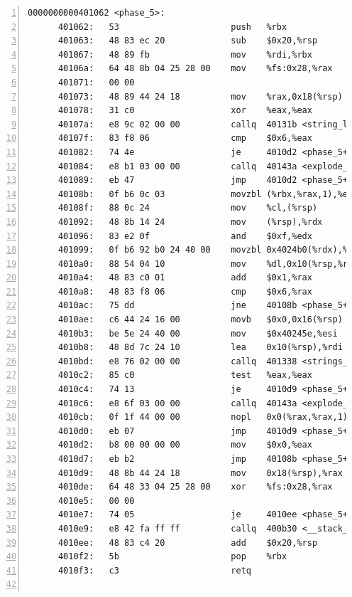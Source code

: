 \documentclass{article}
\begin{document}
\begin{lstlisting}[title = bomb的反汇编代码及部分注释, xleftmargin = 2em,xrightmargin = 2em, aboveskip = 1em, numbers = left, basicstyle=\scriptsize\ttfamily, numberstyle=\scriptsize]
    0000000000401062 <phase_5>:
      401062:	53                   	push   %rbx							
      401063:	48 83 ec 20          	sub    $0x20,%rsp					; %rsp -= 0x20;
      401067:	48 89 fb             	mov    %rdi,%rbx					; %rbx = %rdi;
      40106a:	64 48 8b 04 25 28 00 	mov    %fs:0x28,%rax				; %rax = 0x28;
      401071:	00 00 
      401073:	48 89 44 24 18       	mov    %rax,0x18(%rsp)				; M[%rsp + 0x18] = %rax;
      401078:	31 c0                	xor    %eax,%eax					; %eax ^= %eax;
      40107a:	e8 9c 02 00 00       	callq  40131b <string_length>		; string_length(%rdi);
      40107f:	83 f8 06             	cmp    $0x6,%eax					; if (%eax == 6)
      401082:	74 4e                	je     4010d2 <phase_5+0x70>		;	  goto #500;
      401084:	e8 b1 03 00 00       	callq  40143a <explode_bomb>		; explode_bomb(...);
      401089:	eb 47                	jmp    4010d2 <phase_5+0x70>		; goto #500;
      40108b:	0f b6 0c 03          	movzbl (%rbx,%rax,1),%ecx			; %ecx = %rbx + %rax;
      40108f:	88 0c 24             	mov    %cl,(%rsp)					; M[%rsp] = %cl;
      401092:	48 8b 14 24          	mov    (%rsp),%rdx					; %rdx = M[%rsp];
      401096:	83 e2 0f             	and    $0xf,%edx					; %edx &= 0xf;
      401099:	0f b6 92 b0 24 40 00 	movzbl 0x4024b0(%rdx),%edx			; %edx = M[%rdx + 0x4024b0];
      4010a0:	88 54 04 10          	mov    %dl,0x10(%rsp,%rax,1)		; M[%rsp + %rax + 0x10] = %dl; 
      4010a4:	48 83 c0 01          	add    $0x1,%rax					; %rax++;
      4010a8:	48 83 f8 06          	cmp    $0x6,%rax					; if (%rax != 0x6)
      4010ac:	75 dd                	jne    40108b <phase_5+0x29>		;	  goto #482;
      4010ae:	c6 44 24 16 00       	movb   $0x0,0x16(%rsp)				; M[%rsp + 0x16] = 0;
      4010b3:	be 5e 24 40 00       	mov    $0x40245e,%esi				; %esi = 0x40245e;
      4010b8:	48 8d 7c 24 10       	lea    0x10(%rsp),%rdi				; %rdi = %rsp + 0x10;
      4010bd:	e8 76 02 00 00       	callq  401338 <strings_not_equal>	; strings_not_equal(%rdi, %rsi);
      4010c2:	85 c0                	test   %eax,%eax					; if (%eax == 0)
      4010c4:	74 13                	je     4010d9 <phase_5+0x77>		;	  goto #502;
      4010c6:	e8 6f 03 00 00       	callq  40143a <explode_bomb>		; explode_bomb(...);
      4010cb:	0f 1f 44 00 00       	nopl   0x0(%rax,%rax,1)				; ???
      4010d0:	eb 07                	jmp    4010d9 <phase_5+0x77>		; goto #502;
      4010d2:	b8 00 00 00 00       	mov    $0x0,%eax					; %eax = 0;
      4010d7:	eb b2                	jmp    40108b <phase_5+0x29>		; goto #482;
      4010d9:	48 8b 44 24 18       	mov    0x18(%rsp),%rax				; %rax = M[%rsp + 0x18];
      4010de:	64 48 33 04 25 28 00 	xor    %fs:0x28,%rax				; %rax ^= 0x28;
      4010e5:	00 00 
      4010e7:	74 05                	je     4010ee <phase_5+0x8c>		; goto #507;
      4010e9:	e8 42 fa ff ff       	callq  400b30 <__stack_chk_fail@plt>; 
      4010ee:	48 83 c4 20          	add    $0x20,%rsp					; %rsp += 0x20;
      4010f2:	5b                   	pop    %rbx
      4010f3:	c3                   	retq   
    

\end{lstlisting}
\end{document}
